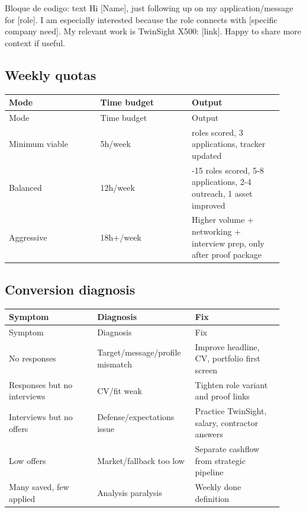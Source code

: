 \begin{mdcode}
Bloque de codigo: text
Hi [Name], just following up on my application/message for [role]. I am especially interested because the role connects with [specific company need]. My relevant work is TwinSight X500: [link]. Happy to share more context if useful.
\end{mdcode}


\subsection{Weekly quotas}


\begin{center}
\scriptsize
\begin{longtable}{>{\raggedright\arraybackslash}p{0.305\linewidth} >{\raggedright\arraybackslash}p{0.305\linewidth} >{\raggedright\arraybackslash}p{0.305\linewidth}}
\toprule
Mode & Time budget & Output \\
\midrule
\endfirsthead
\toprule
Mode & Time budget & Output \\
\midrule
\endhead
Minimum viable & 5h/week & 5 roles scored, 3 applications, tracker updated \\
Balanced & 12h/week & 10-15 roles scored, 5-8 applications, 2-4 outreach, 1 asset improved \\
Aggressive & 18h+/week & Higher volume + networking + interview prep, only after proof package \\
\bottomrule
\end{longtable}
\end{center}


\subsection{Conversion diagnosis}


\begin{center}
\scriptsize
\begin{longtable}{>{\raggedright\arraybackslash}p{0.305\linewidth} >{\raggedright\arraybackslash}p{0.305\linewidth} >{\raggedright\arraybackslash}p{0.305\linewidth}}
\toprule
Symptom & Diagnosis & Fix \\
\midrule
\endfirsthead
\toprule
Symptom & Diagnosis & Fix \\
\midrule
\endhead
No responses & Target/message/profile mismatch & Improve headline, CV, portfolio first screen \\
Responses but no interviews & CV/fit weak & Tighten role variant and proof links \\
Interviews but no offers & Defense/expectations issue & Practice TwinSight, salary, contractor answers \\
Low offers & Market/fallback too low & Separate cashflow from strategic pipeline \\
Many saved, few applied & Analysis paralysis & Weekly done definition \\
\bottomrule
\end{longtable}
\end{center}


